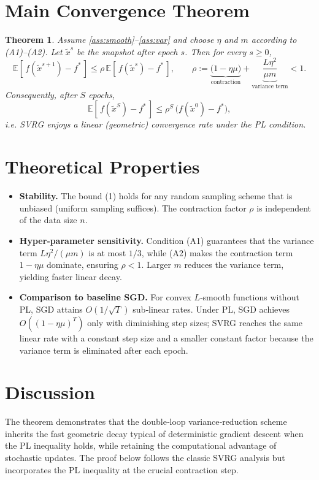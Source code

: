 \documentclass[11pt]{article}
\newtheorem{theorem}{Theorem}
\newcommand{\E}{\mathbb{E}}
\begin{document}
\section*{Main Convergence Theorem}
\begin{theorem}\label{thm:linear}
Assume \ref{ass:smooth}–\ref{ass:var} and choose $\eta$ and $m$ according to (A1)–(A2).  
Let $\tilde{x}^{s}$ be the snapshot after epoch $s$. Then for every $s\ge0$,
\[
    \E\!\left[\,f(\tilde{x}^{s+1})-f^{*}\,\right]
    \le \rho\,\E\!\left[\,f(\tilde{x}^{s})-f^{*}\,\right],
\qquad
    \rho:=\underbrace{\bigl(1-\eta\mu\bigr)}_{\text{contraction}}+
          \underbrace{\frac{L\eta^{2}}{\mu m}}_{\text{variance\ term}}
    <1.
\tag{1}
\]
Consequently, after $S$ epochs,
\[
    \E\!\left[\,f(\tilde{x}^{S})-f^{*}\,\right]
    \le \rho^{S}\,\bigl(f(\tilde{x}^{0})-f^{*}\bigr),
\]
i.e. SVRG enjoys a linear (geometric) convergence rate under the PL condition.
\end{theorem}

\section*{Theoretical Properties}
\begin{itemize}
    \item \textbf{Stability.} The bound (1) holds for any random sampling scheme that is unbiased (uniform sampling suffices). The contraction factor $\rho$ is independent of the data size $n$.
    \item \textbf{Hyper‑parameter sensitivity.} Condition (A1) guarantees that the variance term $L\eta^{2}/(\mu m)$ is at most $1/3$, while (A2) makes the contraction term $1-\eta\mu$ dominate, ensuring $\rho<1$. Larger $m$ reduces the variance term, yielding faster linear decay.
    \item \textbf{Comparison to baseline SGD.} For convex $L$‑smooth functions without PL, SGD attains $O(1/\sqrt{T})$ sub‑linear rates. Under PL, SGD achieves $O((1-\eta\mu)^{T})$ only with diminishing step sizes; SVRG reaches the same linear rate with a constant step size and a smaller constant factor because the variance term is eliminated after each epoch.
\end{itemize}

\section*{Discussion}
The theorem demonstrates that the double‑loop variance‑reduction scheme inherits the fast geometric decay typical of deterministic gradient descent when the PL inequality holds, while retaining the computational advantage of stochastic updates. The proof below follows the classic SVRG analysis but incorporates the PL inequality at the crucial contraction step.
\end{document}
